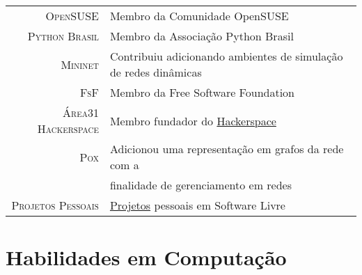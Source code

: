 \documentclass[a4paper,10pt]{article} %
\begin{document}
\begin{tabular}{rl}
\textsc{OpenSUSE}  & Membro da Comunidade OpenSUSE \\
\textsc{Python Brasil}  & Membro da Associação Python Brasil \\
\textsc{Mininet}  & Contribuiu adicionando ambientes de simulação de redes
dinâmicas \\
\textsc{FsF} & Membro da Free Software Foundation \\
\textsc{Área31 Hackerspace} & Membro fundador do 
\href{http://area31.net.br}{Hackerspace} \\
\textsc{Pox} & Adicionou uma representação em grafos da rede com a 
\\ & finalidade de gerenciamento em redes \\
\textsc{Projetos Pessoais} & \href{http://github.com/pantuza}{Projetos} 
pessoais em Software Livre \\
\end{tabular}













\section{Habilidades em Computação}
\end{document}

